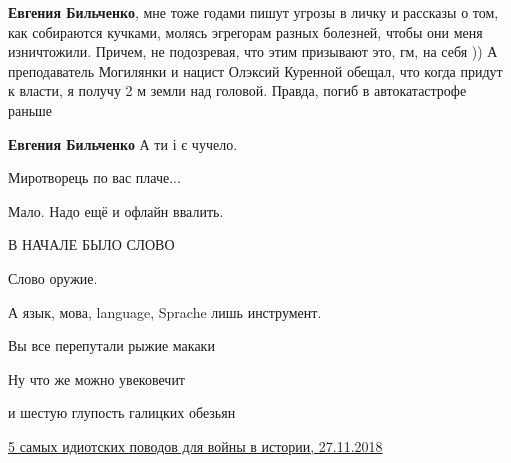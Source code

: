 \begin{itemize}
\begin{itemize}
 
\textbf{Евгения Бильченко}, мне тоже годами пишут угрозы в личку и рассказы о
том, как собираются кучками, молясь эгрегорам разных болезней, чтобы они меня
изничтожили. Причем, не подозревая, что этим призывают это, гм, на себя )) А
преподаватель Могилянки и нацист Олэксий Куренной обещал, что когда придут к
власти, я получу 2 м земли над головой. Правда, погиб в автокатастрофе раньше

 
\textbf{Евгения Бильченко} А ти і є чучело.

 
Миротворець по вас плаче...

 
Мало. Надо ещё и офлайн ввалить.
\end{itemize}

 

В НАЧАЛЕ БЫЛО СЛОВО

Слово оружие.

А язык, мова, language, Sprache лишь инструмент.

Вы все перепутали рыжие макаки

Ну что же можно увековечит

и шестую глупость галицких обезьян

\href{https://disgustingmen.com/history/5-most-stupid-wars}{%
5 самых идиотских поводов для войны в истории, 27.11.2018}

\begin{itemize}
 

\end{itemize}
\end{itemize}
